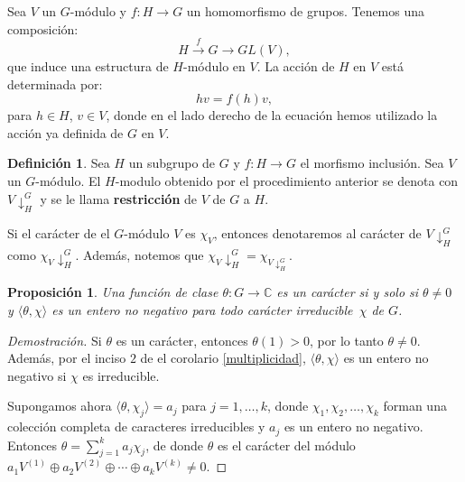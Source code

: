 \documentclass[12pt]{book}
\newtheorem{proposition}[theorem]{Proposición}
\theoremstyle{definition}
\newtheorem{definition}[theorem]{Definición}
\newcounter{in}
\newcounter{ini}
\begin{document}
Sea $V$ un $G$-módulo y $f:H\rightarrow G$ un homomorfismo de
grupos. Tenemos una composición:
\begin{equation*}
  H\stackrel{f}{\rightarrow}G \rightarrow GL(V),
\end{equation*}
que induce una estructura de $H$-módulo en $V$. La acción de $H$ en
$V$ está determinada por:
\begin{equation*}
  hv=f(h)v,
\end{equation*}
para $h\in H$, $v\in V$, donde en el lado derecho de la ecuación hemos
utilizado la acción ya definida de $G$ en $V$. 

\begin{definition}
  Sea $H$ un subgrupo de $G$ y $f:H\rightarrow G$ el morfismo
  inclusión. Sea $V$ un $G$-módulo. El $H$-modulo obtenido por el
  procedimiento anterior se denota con $V\downarrow^{G}_{H}$ y se
  le llama \textbf{restricción} de $V$ de $G$ a $H$.
\end{definition}

Si el carácter de el $G$-módulo $V$ es $\chi_{V}$, entonces
denotaremos al carácter de $V\downarrow^{G}_{H}$ como
$\chi_{V}\downarrow^{G}_{H}$. Además, notemos que
$\chi_{V}\downarrow^{G}_{H}=\chi_{V\downarrow^{G}_{H}}$.


\begin{proposition}
\label{fun-cla-caracter}
Una función de clase $\theta:G\rightarrow\mathbb{C}$ es un carácter si
y solo si $\theta\neq 0$ y $\langle\theta,\chi\rangle$ es un entero no
negativo para todo carácter irreducible~$\chi$ de $G$. 
\end{proposition}
\begin{proof}[Demostración]
Si $\theta$ es un carácter, entonces $\theta(1)>0$, por lo tanto
$\theta\neq 0$. Además, por el inciso $2$ de el corolario
\ref{multiplicidad}, $\langle\theta,\chi\rangle$ es un entero no
negativo si $\chi$ es irreducible.

Supongamos ahora $\langle\theta,\chi_{j}\rangle=a_{j}$ para
$j=1,\ldots,k$, donde $\chi_{1},\chi_{2},\ldots,\chi_{k}$ forman una
colección completa de caracteres irreducibles y $a_{j}$ es un entero
no negativo. Entonces $\theta=\sum^{k}_{j=1}a_{j}\chi_{j}$, de donde
$\theta$ es el carácter del módulo~$a_{1}V^{(1)}\oplus
a_{2}V^{(2)}\oplus\cdots\oplus a_{k}V^{(k)}\neq 0$. 
\end{proof}
\end{document}
